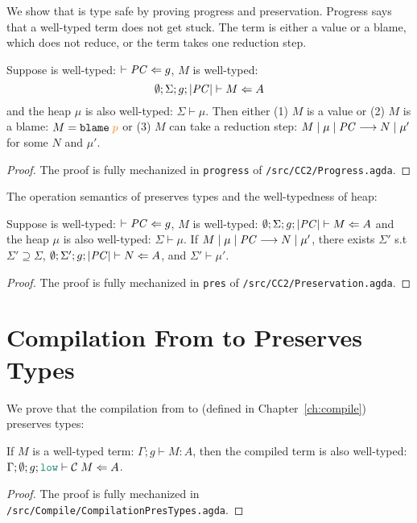 We show that \CC is type safe by proving progress and preservation. Progress
says that a well-typed \CC term does not get stuck. The term is either a value
or a blame, which does not reduce, or the term takes one reduction step.

\begin{lemma}[Progress of \CC]
\label{lem:progress}
Suppose \PC is well-typed: $\vdash \mathit{PC} \Leftarrow g$,
$M$ is well-typed:
\[
\emptyset ; \Sigma ; g ; | \mathit{PC} | \vdash M \Leftarrow A
\]
and the heap $\mu$ is also well-typed: $\Sigma \vdash \mu$.
Then either (1) $M$ is a value or (2) $M$ is a blame: {\normalfont $M = \blame{p}$}
or (3) $M$ can take a reduction step:
${M}\mid{\mu}\mid{\ensuremath{\mathit{PC}}}\longrightarrow{N}\mid{\mu'}$ for some $N$ and $\mu'$.
\end{lemma}
\begin{proof}
  The proof is fully mechanized in \texttt{progress} of \texttt{/src/CC2/Progress.agda}.
\end{proof}

The operation semantics of \CC preserves types and the well-typedness of heap:

\begin{lemma}[Preservation of \CC]
\label{lem:preservation}
Suppose \PC is well-typed:  $\vdash \mathit{PC} \Leftarrow g$,
$M$ is well-typed: $\emptyset ; \Sigma ; g ; |\mathit{PC}| \vdash M \Leftarrow A$
and the heap $\mu$ is also well-typed: $\Sigma \vdash \mu$.
If ${M}\mid{\mu}\mid{\ensuremath{\mathit{PC}}}\longrightarrow{N}\mid{\mu'}$, there exists $\Sigma'$ s.t
$\Sigma' \supseteq \Sigma$, $\emptyset ; \Sigma' ; g ; |\mathit{PC}| \vdash N \Leftarrow A$,
and $\Sigma' \vdash \mu'$.
\end{lemma}
\begin{proof}
  The proof is fully mechanized in \texttt{pres} of \texttt{/src/CC2/Preservation.agda}.
\end{proof}

\section{Compilation From \Surface to \CC Preserves Types}
\label{sec:compile-pres}

We prove that the compilation from \Surface to \CC (defined in
Chapter~\ref{ch:compile}) preserves types:

\begin{lemma}
  \label{lem:compile-pres}
  If $M$ is a well-typed \Surface term: $\Gamma ; g \vdash M : A$, then the
  compiled \CC term is also well-typed: $\Gamma ; \emptyset ; g ; \low \vdash
  \compile{M} \Leftarrow A$.
\end{lemma}
\begin{proof}
  The proof is fully mechanized in
  \texttt{/src/Compile/CompilationPresTypes.agda}.
\end{proof}

